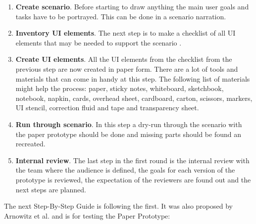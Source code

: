 \begin{enumerate}
	\item \textbf{Create scenario}. Before starting to draw anything the main user goals and tasks have to be portrayed. This can be done in a scenario narration.
	
	\item \textbf{Inventory UI elements}. The next step is to make a checklist of all UI elements that may be needed to support the scenario
	.
	\item \textbf{Create UI elements}. All the UI elements from the checklist from the previous step are now created in paper form. There are a lot of tools and materials that can come in handy at this step. The following list of materials might help the process: paper, sticky notes, whiteboard, sketchbook, notebook, napkin, cards, overhead sheet, cardboard, carton, scissors, markers, UI stencil, correction fluid and tape and transparency sheet. 
	
	\item \textbf{Run through scenario}. In this step a dry-run through the scenario with the paper prototype should be done and missing parts should be found an recreated.
	
	\item \textbf{Internal review}. The last step in the first round is the internal review with the team where the audience is defined, the goals for each version of the prototype is reviewed, the expectation of the reviewers are found out and the next steps are planned.
\end{enumerate}

The next Step-By-Step Guide is following the first. It was also proposed by Arnowitz et al. \cite{arnowitz2010effective} and is for testing the Paper Prototype:

